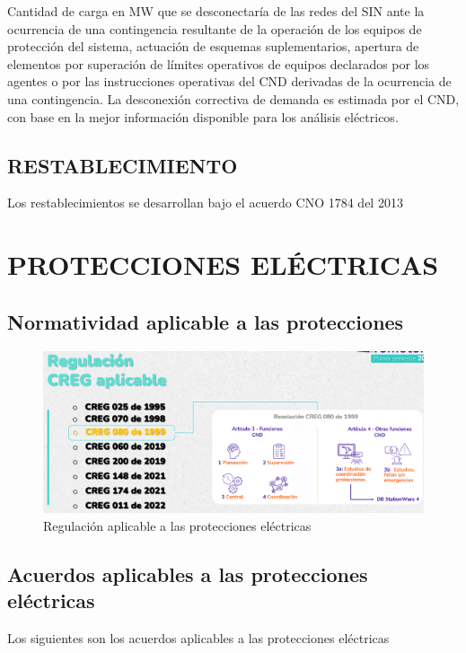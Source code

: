 \documentclass[a5paper]{book}%
\begin{document}
Cantidad de carga en MW que se desconectaría de las redes del SIN ante la ocurrencia de una contingencia resultante de la operación de los equipos de protección del sistema, actuación de esquemas suplementarios, apertura de elementos por superación de límites operativos de equipos declarados por los agentes o por las instrucciones operativas del CND derivadas de la ocurrencia de una contingencia. La desconexión correctiva de demanda es estimada por el CND, con base en la mejor información disponible para los análisis eléctricos.

\section{RESTABLECIMIENTO}

Los restablecimientos se desarrollan bajo el acuerdo CNO 1784 del 2013

    \chapter{PROTECCIONES ELÉCTRICAS}
    
    \section{Normatividad aplicable a las protecciones}
    
    \begin{figure}[H]
    	\centering
    	\caption{Regulación aplicable a las protecciones eléctricas}
    	\label{fig:regulacionprotecciones}
    	\includegraphics[width=0.9\linewidth]{regulacion_protecciones}
    \end{figure}
    
    \section{Acuerdos aplicables a las protecciones eléctricas}
    
    Los siguientes son los acuerdos aplicables a las protecciones eléctricas 
    
\end{document}
